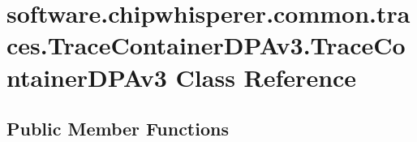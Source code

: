 \hypertarget{classsoftware_1_1chipwhisperer_1_1common_1_1traces_1_1TraceContainerDPAv3_1_1TraceContainerDPAv3}{}\section{software.\+chipwhisperer.\+common.\+traces.\+Trace\+Container\+D\+P\+Av3.\+Trace\+Container\+D\+P\+Av3 Class Reference}
\label{classsoftware_1_1chipwhisperer_1_1common_1_1traces_1_1TraceContainerDPAv3_1_1TraceContainerDPAv3}
\subsection*{Public Member Functions}
